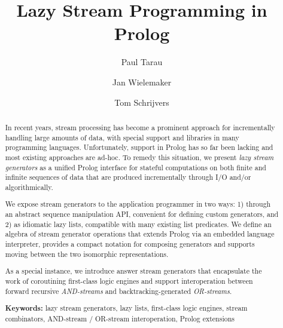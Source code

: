 \documentclass[submission,copyright,creativecommons]{eptcs}
\begin{document}
\title{Lazy Stream Programming in Prolog}


\author{
          Paul Tarau
          \and
          Jan Wielemaker
          \and
          Tom Schrijvers
}          


\def \authorrunning{Paul Tarau, Jan Wielemaker and Tom Schrijvers}
\def\titlerunning{Lazy Stream Programming in Prolog}

\maketitle



\begin{abstract}
In recent years, stream processing has become a prominent approach for incrementally handling large amounts of data, with special support and libraries in many programming languages. Unfortunately, support in Prolog has so far been lacking and most existing approaches are ad-hoc. To remedy this situation, we present {\em lazy stream generators} as a unified Prolog interface for stateful computations on both finite and infinite sequences of data that are produced incrementally through I/O and/or algorithmically.

We expose stream generators to the application programmer in two ways: 1) through an abstract sequence manipulation API, convenient for defining custom generators, and 2) as idiomatic lazy lists, compatible with many existing list predicates.  We define an algebra of stream generator operations that extends Prolog via an embedded language interpreter, provides a compact notation for composing generators and supports moving between the two isomorphic representations.

As a special instance, we introduce answer stream generators that encapsulate the work of coroutining first-class logic engines and support interoperation between forward recursive {\em AND-streams} and backtracking-generated {\em OR-streams}. 

{\bf Keywords:}
lazy stream generators,
lazy lists,
first-class logic engines,
stream combinators,
AND-stream / OR-stream interoperation,
Prolog extensions

\end{abstract}
\end{document}
